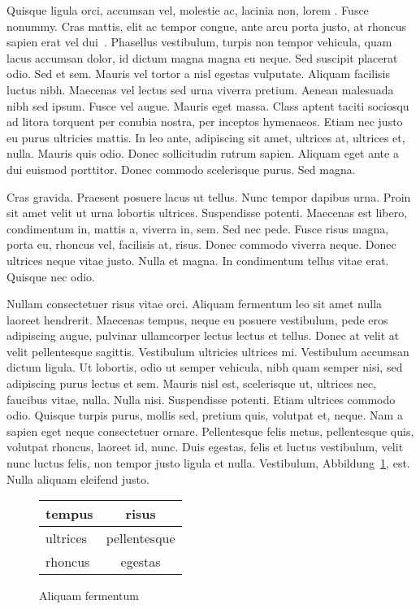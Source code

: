 Quisque ligula orci, accumsan vel, molestie ac, lacinia non, lorem . Fusce nonummy. Cras mattis, elit ac tempor congue, ante arcu porta justo, at rhoncus sapien erat vel dui~\cite{latexbib}. Phasellus vestibulum, turpis non tempor vehicula, quam lacus accumsan dolor, id dictum magna magna eu neque. Sed suscipit placerat odio. Sed et sem. Mauris vel tortor a nisl egestas vulputate. Aliquam facilisis luctus nibh. Maecenas vel lectus sed urna viverra pretium. Aenean malesuada nibh sed ipsum. Fusce vel augue. Mauris eget massa. Class aptent taciti sociosqu ad litora torquent per conubia nostra, per inceptos hymenaeos. Etiam nec justo eu purus ultricies mattis. In leo ante, adipiscing sit amet, ultrices at, ultrices et, nulla. Mauris quis odio. Donec sollicitudin rutrum sapien. Aliquam eget ante a dui euismod porttitor. Donec commodo scelerisque purus. Sed magna.

Cras gravida. Praesent posuere lacus ut tellus. Nunc tempor dapibus urna. Proin sit amet velit ut urna lobortis ultrices. Suspendisse potenti. Maecenas est libero, condimentum in, mattis a, viverra in, sem. Sed nec pede. Fusce risus magna, porta eu, rhoncus vel, facilisis at, risus. Donec commodo viverra neque. Donec ultrices neque vitae justo. Nulla et magna. In condimentum tellus vitae erat. Quisque nec odio.


Nullam consectetuer risus vitae orci. Aliquam fermentum leo sit amet nulla laoreet hendrerit. Maecenas tempus, neque eu posuere vestibulum, pede eros adipiscing augue, pulvinar ullamcorper lectus lectus et tellus. Donec at velit at velit pellentesque sagittis. Vestibulum ultricies ultrices mi. Vestibulum accumsan dictum ligula. Ut lobortis, odio ut semper vehicula, nibh quam semper nisi, sed adipiscing purus lectus et sem. Mauris nisl est, scelerisque ut, ultrices nec, faucibus vitae, nulla. Nulla nisi. Suspendisse potenti. Etiam ultrices commodo odio. Quisque turpis purus, mollis sed, pretium quis, volutpat et, neque. Nam a sapien eget neque consectetuer ornare. Pellentesque felis metus, pellentesque quis, volutpat rhoncus, laoreet id, nunc. Duis egestas, felis et luctus vestibulum, velit nunc luctus felis, non tempor justo ligula et nulla. Vestibulum, Abbildung~\ref{fig:tabelle}, est. Nulla aliquam eleifend justo.

\begin{figure}[htb]
  \centering
  \begin{tabular}{|l|c|}
    \hline
    \textbf{tempus} & \textbf{risus} \\ \hline
    ultrices & pellentesque \\
    rhoncus & egestas \\
    \hline
  \end{tabular}
  \caption{Aliquam fermentum}\label{fig:tabelle}
\end{figure}

